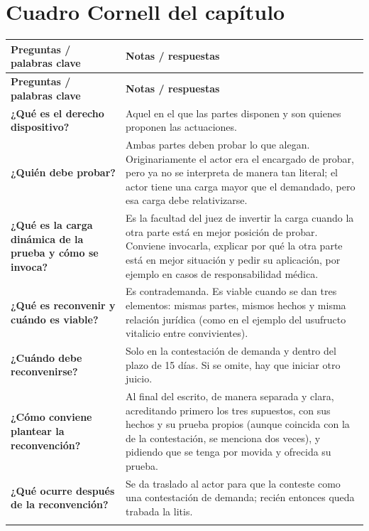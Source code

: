 \documentclass[12pt,oneside]{book}
\newenvironment{cornell}{%
  \begin{longtable}{>{\raggedright\arraybackslash}p{0.26\textwidth}>{\raggedright\arraybackslash}p{0.64\textwidth}}
  \toprule
  \textbf{Preguntas / palabras clave} & \textbf{Notas / respuestas} \\
  \midrule
  \endfirsthead
  \toprule
  \textbf{Preguntas / palabras clave} & \textbf{Notas / respuestas} \\
  \midrule
  \endhead
}{%
  \bottomrule
  \end{longtable}
}
\newcommand{\cornellresumen}[1]{%
  \midrule
  \multicolumn{2}{p{\dimexpr0.90\textwidth+2\tabcolsep\relax}}{\textbf{Resumen:} #1} \\
}
\begin{document}
\section{Cuadro Cornell del capítulo}

\begin{cornell}
\textbf{¿Qué es el derecho dispositivo?} &
Aquel en el que las partes disponen y son quienes proponen las actuaciones. \\
\addlinespace
\textbf{¿Quién debe probar?} &
Ambas partes deben probar lo que alegan. Originariamente el actor era el encargado de probar, pero ya no se interpreta de manera tan literal; el actor tiene una carga mayor que el demandado, pero esa carga debe relativizarse. \\
\addlinespace
\textbf{¿Qué es la carga dinámica de la prueba y cómo se invoca?} &
Es la facultad del juez de invertir la carga cuando la otra parte está en mejor posición de probar. Conviene invocarla, explicar por qué la otra parte está en mejor situación y pedir su aplicación, por ejemplo en casos de responsabilidad médica. \\
\addlinespace
\textbf{¿Qué es reconvenir y cuándo es viable?} &
Es contrademanda. Es viable cuando se dan tres elementos: mismas partes, mismos hechos y misma relación jurídica (como en el ejemplo del usufructo vitalicio entre convivientes). \\
\addlinespace
\textbf{¿Cuándo debe reconvenirse?} &
Solo en la contestación de demanda y dentro del plazo de 15 días. Si se omite, hay que iniciar otro juicio. \\
\addlinespace
\textbf{¿Cómo conviene plantear la reconvención?} &
Al final del escrito, de manera separada y clara, acreditando primero los tres supuestos, con sus hechos y su prueba propios (aunque coincida con la de la contestación, se menciona dos veces), y pidiendo que se tenga por movida y ofrecida su prueba. \\
\addlinespace
\textbf{¿Qué ocurre después de la reconvención?} &
Se da traslado al actor para que la conteste como una contestación de demanda; recién entonces queda trabada la litis. \\
\cornellresumen{Ambas partes deben probar lo que alegan, y puede invocarse la carga dinámica cuando la otra parte esté en mejor posición de probar. La reconvención exige mismas partes, mismos hechos y misma relación jurídica; solo procede en la contestación, preferentemente al final del escrito y con prueba propia, y si se omite hay que iniciar otro juicio.}
\end{cornell}
\end{document}

